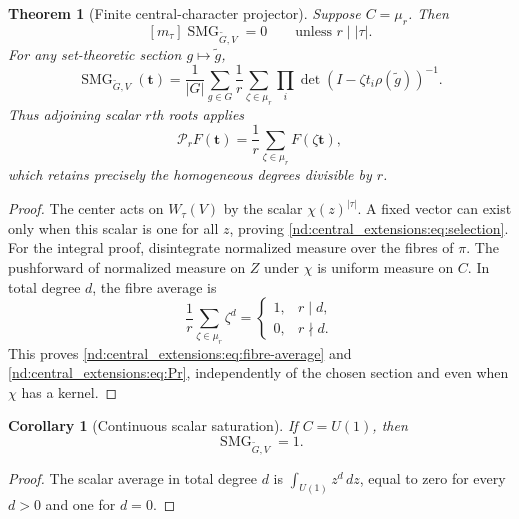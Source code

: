 \documentclass[10pt]{article}
\newcommand{\SMG}{\operatorname{SMG}}
\newcommand{\MGF}{\SMG}
\newcommand{\PP}{\mathcal P}
\newtheorem{theorem}{Theorem}
\newtheorem{corollary}{Corollary}
\begin{document}
\begin{theorem}[Finite central-character projector]\label{nd:central_extensions:thm:projector}
Suppose $C=\mu_r$.  Then
\begin{equation}\label{nd:central_extensions:eq:selection}
 [m_\tau]\MGF_{\widetilde G,V}=0\qquad\text{unless }r\mid|\tau|.
\end{equation}
For any set-theoretic section $g\mapsto\widetilde g$,
\begin{equation}\label{nd:central_extensions:eq:fibre-average}
 \boxed{\MGF_{\widetilde G,V}(\mathbf t)
 =\frac1{|G|}\sum_{g\in G}\frac1r\sum_{\zeta\in\mu_r}
 \prod_i\det(I-\zeta t_i\rho(\widetilde g))^{-1}.}
\end{equation}
Thus adjoining scalar $r$th roots applies
\begin{equation}\label{nd:central_extensions:eq:Pr}
 \PP_rF(\mathbf t)=\frac1r\sum_{\zeta\in\mu_r}F(\zeta\mathbf t),
\end{equation}
which retains precisely the homogeneous degrees divisible by $r$.
\end{theorem}

\begin{proof}
The center acts on $W_\tau(V)$ by the scalar $\chi(z)^{|\tau|}$.
A fixed vector can exist only when this scalar is one for all $z$, proving
\eqref{nd:central_extensions:eq:selection}.  For the integral proof, disintegrate normalized
measure over the fibres of $\pi$.  The pushforward of normalized measure on
$Z$ under $\chi$ is uniform measure on $C$.  In total degree $d$, the fibre
average is
\[
 \frac1r\sum_{\zeta\in\mu_r}\zeta^d
 =\begin{cases}1,&r\mid d,\\0,&r\nmid d.\end{cases}
\]
This proves \eqref{nd:central_extensions:eq:fibre-average} and \eqref{nd:central_extensions:eq:Pr}, independently of
the chosen section and even when $\chi$ has a kernel.
\end{proof}

\begin{corollary}[Continuous scalar saturation]\label{nd:central_extensions:cor:u1}
If $C=U(1)$, then
\[
 \boxed{\MGF_{\widetilde G,V}=1.}
\]
\end{corollary}

\begin{proof}
The scalar average in total degree $d$ is
$\int_{U(1)}z^d\,dz$, equal to zero for every $d>0$ and one for $d=0$.
\end{proof}
\end{document}
